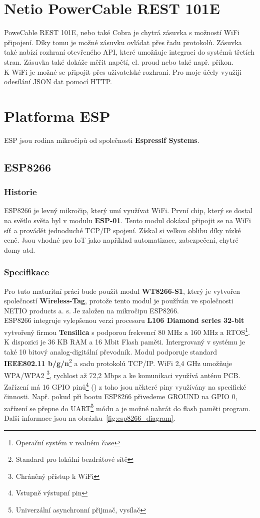 \documentclass[a4paper, 12pt]{report}
\begin{document}
    \section{Netio PowerCable REST 101E}\label{sec:netio-powercable-rest-101e}
    PoweCable REST 101E, nebo také Cobra je chytrá zásuvka s možností WiFi připojení.
    Díky tomu je možné zásuvku ovládat přes řadu protokolů.
    Zásuvka také nabízí rozhraní otevřeného API, které umožňuje integraci do systémů třetích stran. Zásuvka také dokáže měřit napětí, el. proud nebo také např. příkon. \\
    K WiFi je možné se připojit přes uživatelské rozhraní.
    Pro moje účely využiji odesílání JSON dat pomocí HTTP\@.


    \section{Platforma ESP}\label{sec:platforma-esp}
    ESP jsou rodina mikročipů od společnosti \textbf{Espressif Systems}.

    \subsection{ESP8266}\label{subsec:esp8266}

    \subsubsection{Historie}
    ESP8266 je levný mikročip, který umí využívat WiFi. První chip, který se dostal na světlo světa byl v modulu \textbf{ESP-01}. Tento modul dokázal připojit se na WiFi síť a provádět jednoduché TCP/IP spojení. Získal si velkou oblibu díky nízké ceně. Jsou vhodné pro IoT jako například automatizace, zabezpečení, chytré domy atd.

    \subsubsection{Specifikace}
    Pro tuto maturitní práci bude použit modul \textbf{WT8266-S1}, který je vytvořen společností \textbf{Wireless-Tag}, protože tento modul je používán ve společnosti NETIO products a. s. Je založen na mikročipu ESP8266.\\
    ESP8266 integruje vylepšenou verzi procesoru \textbf{L106 Diamond series 32-bit} vytvořený firmou \textbf{Tensilica} s podporou frekvencí 80 \si{MHz} a 160 \si{MHz} a RTOS\footnote{Operační systém v realném čase}.
    K dispozici je 36 \si{KB} RAM a 16 \si{Mbit} Flash paměti.
    Intergrovaný v systému je také 10 bitový analog-digitální převodník.
    Modul podporuje standard \textbf{IEEE802.11 b/g/n}\footnote{Standard pro lokální bezdrátové sítě} a sadu protokolů TCP/IP. WiFi 2,4 \si{GHz} umožňuje WPA/WPA2 \footnote{Chráněný přístup k WiFi}, rychlost až 72,2 \si{Mbps} a ke komunikaci využívá anténu PCB. Zařízení má 16 GPIO pinů\footnote{Vstupně výstupní pin} () z toho jsou některé piny využívány na specifické činnosti. Např. pokud při bootu ESP8266 přivedeme GROUND na GPIO 0, zařízení se přepne do UART\footnote{Univerzální asynchronní přijmač, vysílač} módu a je možné nahrát do flash paměti program. Další informace jsou na obrázku~\ref{fig:esp8266_diagram}.
\end{document}
